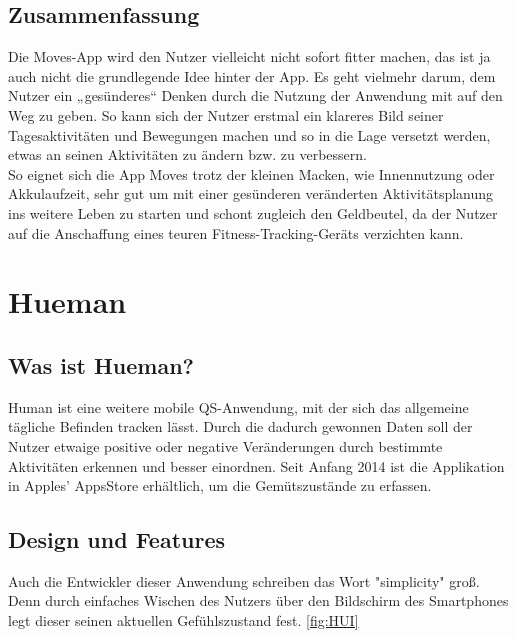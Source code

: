 \subsection{Zusammenfassung}
\label{ch:Apps:sec:Moves:subsec:VERDICT} 

Die Moves-App wird den Nutzer vielleicht nicht sofort fitter machen, das ist ja auch nicht die grundlegende Idee hinter der App. 
Es geht vielmehr darum, dem Nutzer ein „gesünderes“ Denken durch die Nutzung der Anwendung mit auf den Weg zu geben. 
So kann sich der Nutzer erstmal ein klareres Bild seiner Tagesaktivitäten und Bewegungen machen und so in die Lage versetzt werden, etwas an seinen Aktivitäten zu ändern bzw. zu verbessern.
\\
So eignet sich die App Moves trotz der kleinen Macken, wie Innennutzung oder Akkulaufzeit, sehr gut um mit einer gesünderen veränderten Aktivitätsplanung ins weitere Leben zu starten und schont zugleich den Geldbeutel, da der Nutzer auf die Anschaffung eines teuren Fitness-Tracking-Geräts verzichten kann.

\section{Hueman}
\label{ch:Apps:sec:Hueman}

\subsection{Was ist Hueman?}
\label{ch:Apps:sec:Hueman:subsec:WIH}

Human ist eine weitere mobile QS-Anwendung, mit der sich das allgemeine tägliche Befinden tracken lässt. 
Durch die dadurch gewonnen Daten soll der Nutzer etwaige positive oder negative Veränderungen durch bestimmte Aktivitäten erkennen und besser einordnen.
Seit Anfang 2014 ist die Applikation in Apples' AppsStore erhältlich, um die Gemütszustände zu erfassen.


\subsection{Design und Features}
\label{ch:Apps:sec:Hueman:subsec:DuFe}

Auch die Entwickler dieser Anwendung schreiben das Wort "simplicity" groß. 
Denn durch einfaches Wischen des Nutzers über den Bildschirm des Smartphones legt dieser seinen aktuellen Gefühlszustand fest.
\ref{fig:HUI}

